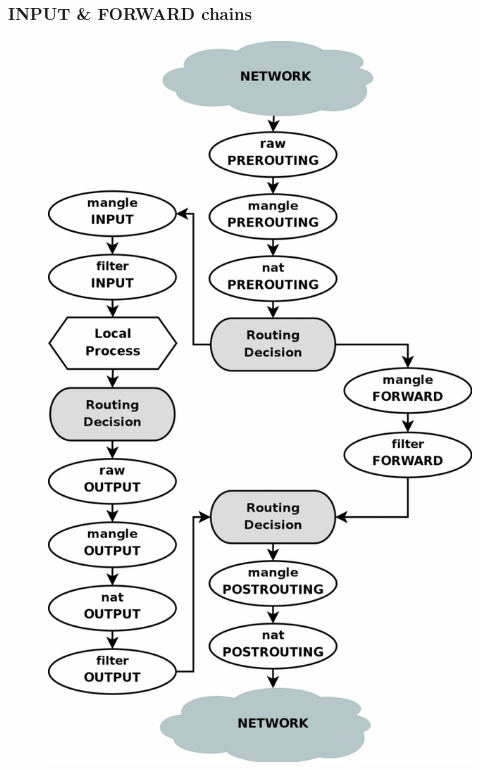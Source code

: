 \documentclass{beamer}
\begin{document}
\begin{frame}
\frametitle{INPUT \& FORWARD chains}
\begin{figure}
\includegraphics[trim={0 0 0 8cm},clip, width=\textwidth]{tables_traverse}
\end{figure}
\end{frame}
\end{document}
